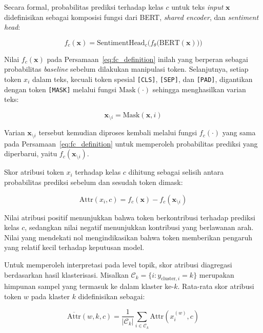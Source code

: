 Secara formal, probabilitas prediksi terhadap kelas $c$ untuk teks
\textit{input} $\mathbf{x}$ didefinisikan sebagai komposisi fungsi dari
BERT, \textit{shared encoder}, dan \textit{sentiment head}:

\begin{equation}
    f_c(\mathbf{x}) = \text{SentimentHead}_c\Big(f_\theta\big(\text{BERT}(\mathbf{x})\big)\Big)
    \label{eq:fc_definition}
\end{equation}

\noindent Nilai $f_c(\mathbf{x})$ pada Persamaan~\ref{eq:fc_definition}
inilah yang berperan sebagai probabilitas \textit{baseline} sebelum
dilakukan manipulasi token. Selanjutnya, setiap token $x_i$ dalam teks,
kecuali token spesial \texttt{[CLS]}, \texttt{[SEP]}, dan \texttt{[PAD]},
digantikan dengan token \texttt{[MASK]} melalui fungsi $\text{Mask}(\cdot)$
sehingga menghasilkan varian teks:

\begin{equation}
    \mathbf{x}_{\setminus i} = \text{Mask}(\mathbf{x}, i)
    \label{eq:mask_definition}
\end{equation}

\noindent Varian $\mathbf{x}_{\setminus i}$ tersebut kemudian diproses
kembali melalui fungsi $f_c(\cdot)$ yang sama pada Persamaan~\ref{eq:fc_definition}
untuk memperoleh probabilitas prediksi yang diperbarui, yaitu
$f_c(\mathbf{x}_{\setminus i})$.

Skor atribusi token $x_i$ terhadap kelas $c$ dihitung sebagai selisih antara
probabilitas prediksi sebelum dan sesudah token dimask:

\begin{equation}
    \text{Attr}(x_i, c) = f_c(\mathbf{x}) - f_c(\mathbf{x}_{\setminus i})
    \label{eq:occlusion_bab3}
\end{equation}

\noindent Nilai atribusi positif menunjukkan bahwa token berkontribusi terhadap
prediksi kelas $c$, sedangkan nilai negatif menunjukkan kontribusi yang berlawanan
arah. Nilai yang mendekati nol mengindikasikan bahwa token memberikan pengaruh yang
relatif kecil terhadap keputusan model.

Untuk memperoleh interpretasi pada level topik, skor atribusi diagregasi berdasarkan
hasil klasterisasi. Misalkan $\mathcal{C}_k=\{i:y_{\text{cluster},i}=k\}$ merupakan himpunan
sampel yang termasuk ke dalam klaster ke-$k$. Rata-rata skor atribusi token $w$ pada klaster $k$ didefinisikan sebagai:

\begin{equation}
    \overline{\text{Attr}}(w, k, c) =
    \frac{1}{|\mathcal{C}_k|}
    \sum_{i \in \mathcal{C}_k} \text{Attr}(x_i^{(w)}, c)
    \label{eq:cluster_attr}
\end{equation}

